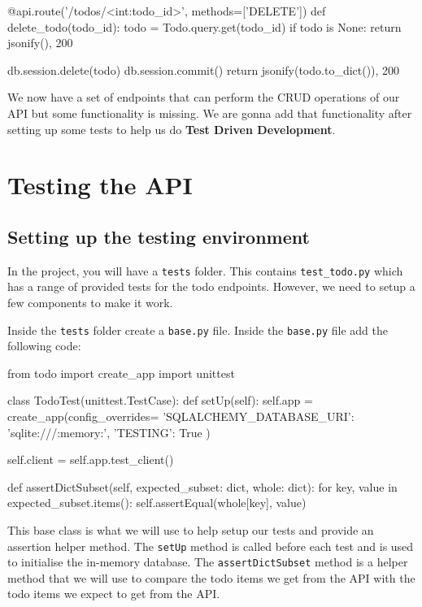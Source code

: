 \documentclass{csse4400}
\begin{document}
\begin{code}[language=python,numbers=none]{}
@api.route('/todos/<int:todo_id>', methods=['DELETE'])
def delete_todo(todo_id):
    todo = Todo.query.get(todo_id)
    if todo is None:
        return jsonify({}), 200

    db.session.delete(todo)
    db.session.commit()
    return jsonify(todo.to_dict()), 200
\end{code}

We now have a set of endpoints that can perform the CRUD operations of our API but some functionality is missing.
We are gonna add that functionality after setting up some tests to help us do \textbf{Test Driven Development}.

\section{Testing the API}

\subsection{Setting up the testing environment}

In the project, you will have a \texttt{tests} folder.
This contains \texttt{test\_todo.py} which has a range of provided tests for the todo endpoints.
However, we need to setup a few components to make it work.

Inside the \texttt{tests} folder create a \texttt{base.py} file. Inside the \texttt{base.py} file add the following code:

\begin{code}[language=python,numbers=none]{}
  from todo import create_app
  import unittest
  
  
  class TodoTest(unittest.TestCase):
      def setUp(self):
          self.app = create_app(config_overrides={
              'SQLALCHEMY_DATABASE_URI': 'sqlite:///:memory:',
              'TESTING': True
          })
  
          self.client = self.app.test_client()
  
      def assertDictSubset(self, expected_subset: dict, whole: dict):
          for key, value in expected_subset.items():
              self.assertEqual(whole[key], value)
\end{code}


This base class is what we will use to help setup our tests and provide an assertion helper method.
The \texttt{setUp} method is called before each test and is used to initialise the in-memory database.
The \texttt{assertDictSubset} method is a helper method that we will use to compare the todo items we get from the API with the todo items we expect to get from the API.
\end{document}
